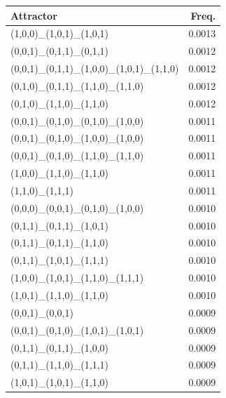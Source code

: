 \documentclass[11pt]{article}
\begin{document}
\begin{minipage}[t]{0.45\linewidth}
\begin{tabular}{@{}lr@{}}
\toprule
Attractor & Freq.\\
\midrule
(1,0,0)\_(1,0,1)\_(1,0,1)                         & 0.0013 \\
(0,0,1)\_(0,1,1)\_(0,1,1)                         & 0.0012 \\
(0,0,1)\_(0,1,1)\_(1,0,0)\_(1,0,1)\_(1,1,0)      & 0.0012 \\
(0,1,0)\_(0,1,1)\_(1,1,0)\_(1,1,0)                & 0.0012 \\
(0,1,0)\_(1,1,0)\_(1,1,0)                         & 0.0012 \\
(0,0,1)\_(0,1,0)\_(0,1,0)\_(1,0,0)                & 0.0011 \\
(0,0,1)\_(0,1,0)\_(1,0,0)\_(1,0,0)                & 0.0011 \\
(0,0,1)\_(0,1,0)\_(1,1,0)\_(1,1,0)                & 0.0011 \\
(1,0,0)\_(1,1,0)\_(1,1,0)                         & 0.0011 \\
(1,1,0)\_(1,1,1)                                   & 0.0011 \\
(0,0,0)\_(0,0,1)\_(0,1,0)\_(1,0,0)                & 0.0010 \\
(0,1,1)\_(0,1,1)\_(1,0,1)                         & 0.0010 \\
(0,1,1)\_(0,1,1)\_(1,1,0)                         & 0.0010 \\
(0,1,1)\_(1,0,1)\_(1,1,1)                         & 0.0010 \\
(1,0,0)\_(1,0,1)\_(1,1,0)\_(1,1,1)                & 0.0010 \\
(1,0,1)\_(1,1,0)\_(1,1,0)                         & 0.0010 \\
(0,0,1)\_(0,0,1)                                   & 0.0009 \\
(0,0,1)\_(0,1,0)\_(1,0,1)\_(1,0,1)                & 0.0009 \\
(0,1,1)\_(0,1,1)\_(1,0,0)                         & 0.0009 \\
(0,1,1)\_(1,1,0)\_(1,1,1)                         & 0.0009 \\
(1,0,1)\_(1,0,1)\_(1,1,0)                         & 0.0009 \\
\bottomrule
\end{tabular}
\end{minipage} \newpage 
\end{document}
